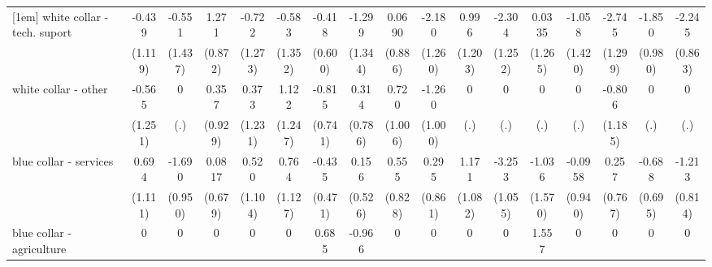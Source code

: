 {\begin{tabular}{l*{16}{c}}
[1em]
white collar - tech. suport&      -0.439         &      -0.551         &       1.271         &      -0.722         &      -0.583         &      -0.418         &      -1.299         &      0.0690         &      -2.180         &       0.996         &      -2.304         &      0.0335         &      -1.058         &      -2.745\sym{*}  &      -1.850         &      -2.245\sym{**} \\
                    &     (1.119)         &     (1.437)         &     (0.872)         &     (1.273)         &     (1.352)         &     (0.600)         &     (1.344)         &     (0.886)         &     (1.260)         &     (1.203)         &     (1.252)         &     (1.265)         &     (1.420)         &     (1.299)         &     (0.980)         &     (0.863)         \\
[1em]
white collar - other&      -0.565         &           0         &       0.357         &       0.373         &       1.122         &      -0.815         &       0.314         &       0.720         &      -1.260         &           0         &           0         &           0         &           0         &      -0.806         &           0         &           0         \\
                    &     (1.251)         &         (.)         &     (0.929)         &     (1.231)         &     (1.247)         &     (0.741)         &     (0.786)         &     (1.006)         &     (1.000)         &         (.)         &         (.)         &         (.)         &         (.)         &     (1.185)         &         (.)         &         (.)         \\
[1em]
blue collar - services&       0.694         &      -1.690         &      0.0817         &       0.520         &       0.764         &      -0.435         &       0.156         &       0.555         &       0.295         &       1.171         &      -3.253\sym{**} &      -1.036         &     -0.0958         &       0.257         &      -0.688         &      -1.213         \\
                    &     (1.111)         &     (0.950)         &     (0.679)         &     (1.104)         &     (1.127)         &     (0.471)         &     (0.526)         &     (0.828)         &     (0.861)         &     (1.082)         &     (1.055)         &     (1.570)         &     (0.940)         &     (0.767)         &     (0.695)         &     (0.814)         \\
[1em]
blue collar - agriculture&           0         &           0         &           0         &           0         &           0         &       0.685         &      -0.966         &           0         &           0         &           0         &           0         &       1.557         &           0         &           0         &           0         &           0         \\

\end{tabular}}
